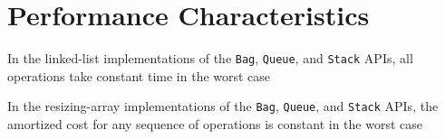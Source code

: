 \documentclass[8pt,a4paper,compress]{beamer}
\begin{document}
\section{Performance Characteristics}
\begin{frame}[fragile]
\pause

In the linked-list implementations of the \lstinline{Bag}, \lstinline{Queue}, and \lstinline{Stack} APIs, all operations take constant time in the worst case

\pause\bigskip

In the resizing-array implementations of the \lstinline{Bag}, \lstinline{Queue}, and \lstinline{Stack} APIs, the amortized cost for any sequence of operations is constant in the worst case
\end{frame}
\end{document}

